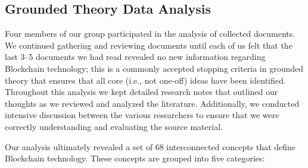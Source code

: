 \subsection{Grounded Theory Data Analysis}
Four members of our group participated in the analysis of collected documents.
We continued gathering and reviewing documents until each of us felt that the last 3--5 documents we had read revealed no new information regarding Blockchain technology; this is a commonly accepted stopping criteria in grounded theory that ensures that all core (i.e., not one-off) ideas have been identified.
Throughout this analysis we kept detailed research notes that outlined our thoughts as we reviewed and analyzed the literature.
Additionally, we conducted intensive discussion between the various researchers to ensure that we were correctly understanding and evaluating the source material.

Our analysis ultimately revealed a set of 68 interconnected concepts that 
define Blockchain technology.
These concepts are grouped into five categories:

